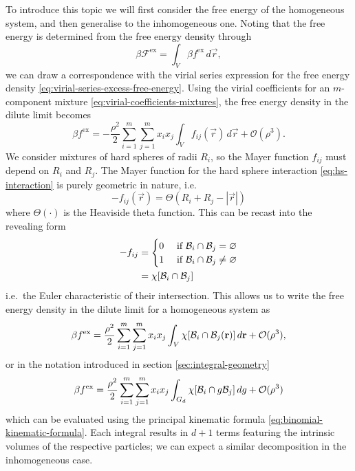 To introduce this topic we will first consider the free energy of the homogeneous system, and then generalise to the inhomogeneous one.
Noting that the free energy is determined from the free energy density through
\begin{equation*}
  \beta \mathcal{F}^\mathrm{ex} = \int_V \beta f^\mathrm{ex} \, d\vec{r},
\end{equation*}
we can draw a correspondence with the virial series expression for the free energy density \eqref{eq:virial-series-excess-free-energy}.
Using the virial coefficients for an $m$-component mixture \eqref{eq:virial-coefficients-mixtures}, the free energy density in the dilute limit becomes%
\begin{equation*}
  \beta f^\mathrm{ex}
  =
  - \frac{\rho^2}{2}
  \sum_{i = 1}^m \sum_{j = 1}^m x_i x_j \int_V
  f_{ij}(\vec{r})
  \, d\vec{r}
  + \mathcal{O}(\rho^3).
\end{equation*}
We consider mixtures of hard spheres of radii $R_i$, so the Mayer function $f_{ij}$ must depend on $R_i$ and $R_j$.
The Mayer function for the hard sphere interaction \eqref{eq:hs-interaction} is purely geometric in nature, i.e.\
\begin{equation*}
  -f_{ij}(\vec{r})
  =
  \Theta(R_i + R_j - |\vec{r}|)
\end{equation*}
where $\Theta(\cdot)$ is the Heaviside theta function.
This can be recast into the revealing form
\begin{equation*}
  \begin{split}
    -f_{ij}
    &=
    \begin{cases}
      0 & \textrm{ if } \mathcal{B}_i \cap \mathcal{B}_j = \varnothing \\
      1 & \textrm{ if } \mathcal{B}_i \cap \mathcal{B}_j \ne \varnothing
    \end{cases}
    \\ &=
    \chi[\mathcal{B}_i \cap \mathcal{B}_j]
  \end{split}
\end{equation*}
i.e.\ the Euler characteristic of their intersection.
This allows us to write the free energy density in the dilute limit for a homogeneous system as
\begin{equation*}
  \beta f^\mathrm{ex}
  =
  \frac{\rho^2}{2}
  \sum_{i=1}^m \sum_{j=1}^m
  x_i x_j
  \int_V \chi[\mathcal{B}_i \cap \mathcal{B}_j(\boldsymbol{\mathbf{r}})] \, d\boldsymbol{\mathbf{r}}
  + \mathcal{O}(\rho^3),
\end{equation*}
or in the notation introduced in section \ref{sec:integral-geometry}
\begin{equation*}
  \beta f^\mathrm{ex}
  =
  \frac{\rho^2}{2}
  \sum_{i=1}^m \sum_{j=1}^m
  x_i x_j
  \int_{G_d} \chi[\mathcal{B}_i \cap g \mathcal{B}_j] \, dg
  + \mathcal{O}(\rho^3)
\end{equation*}
which can be evaluated using the principal kinematic formula \eqref{eq:binomial-kinematic-formula}.
Each integral results in $d+1$ terms featuring the intrinsic volumes of the respective particles; we can expect a similar decomposition in the inhomogeneous case.

